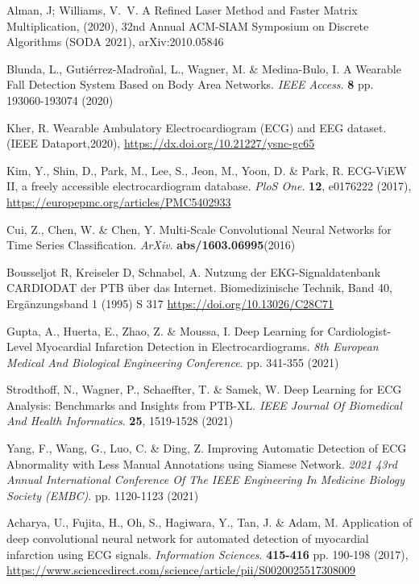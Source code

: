 \documentclass{ieeeaccess}
\begin{document}
\begin{thebibliography}{1}
Alman, J; Williams, V.\ V. A Refined Laser Method and Faster Matrix Multiplication, (2020), 32nd Annual ACM-SIAM Symposium on Discrete Algorithms (SODA 2021), arXiv:2010.05846


Blunda, L., Gutiérrez-Madroñal, L., Wagner, M. \& Medina-Bulo, I. A Wearable Fall Detection System Based on Body Area Networks. {\em IEEE Access}. \textbf{8} pp. 193060-193074 (2020)

Kher, R. Wearable Ambulatory Electrocardiogram (ECG) and EEG dataset. (IEEE Dataport,2020), \url{https://dx.doi.org/10.21227/ysnc-gc65}

Kim, Y., Shin, D., Park, M., Lee, S., Jeon, M., Yoon, D. \& Park, R. ECG-ViEW II, a freely accessible electrocardiogram database. {\em PloS One}. \textbf{12}, e0176222 (2017), \url{https://europepmc.org/articles/PMC5402933}


Cui, Z., Chen, W. \& Chen, Y. Multi-Scale Convolutional Neural Networks for Time Series Classification.  {\em ArXiv}. \textbf{abs/1603.06995}(2016)

Bousseljot R, Kreiseler D, Schnabel, A. Nutzung der EKG-Signaldatenbank CARDIODAT der PTB über das Internet. Biomedizinische Technik, Band 40, Ergänzungsband 1 (1995) S 317 \url{https://doi.org/10.13026/C28C71}

Gupta, A., Huerta, E., Zhao, Z. \& Moussa, I. Deep Learning for Cardiologist-Level Myocardial Infarction Detection in Electrocardiograms. {\em 8th European Medical And Biological Engineering Conference}. pp. 341-355 (2021)

Strodthoff, N., Wagner, P., Schaeffter, T. \& Samek, W. Deep Learning for ECG Analysis: Benchmarks and Insights from PTB-XL. {\em IEEE Journal Of Biomedical And Health Informatics}. \textbf{25}, 1519-1528 (2021)


Yang, F., Wang, G., Luo, C. \& Ding, Z. Improving Automatic Detection of ECG Abnormality with Less Manual Annotations using Siamese Network. {\em 2021 43rd Annual International Conference Of The IEEE Engineering In Medicine Biology Society (EMBC)}. pp. 1120-1123 (2021)


Acharya, U., Fujita, H., Oh, S., Hagiwara, Y., Tan, J. \& Adam, M. Application of deep convolutional neural network for automated detection of myocardial infarction using ECG signals. {\em Information Sciences}. \textbf{415-416} pp. 190-198 (2017), \url{https://www.sciencedirect.com/science/article/pii/S0020025517308009}


\end{thebibliography}
\end{document}
